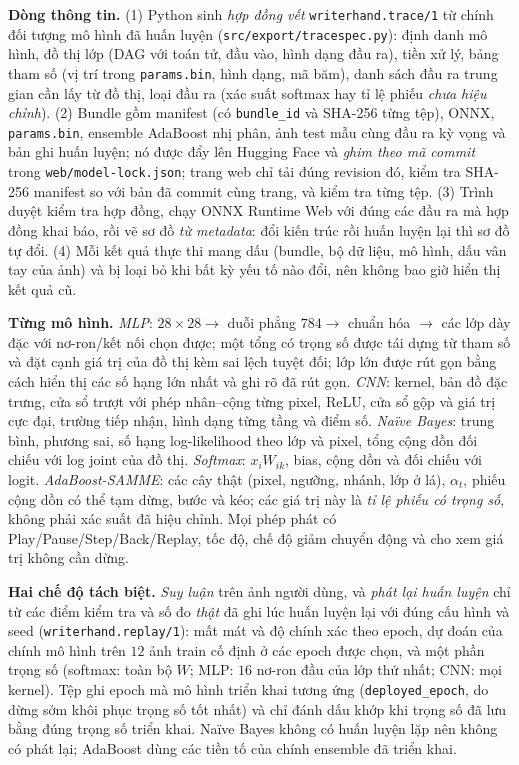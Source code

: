 \textbf{Dòng thông tin.} (1) Python sinh \emph{hợp đồng vết} \texttt{writerhand.trace/1} từ chính đối tượng mô hình đã huấn luyện (\texttt{src/export/tracespec.py}): định danh mô hình, đồ thị lớp (DAG với toán tử, đầu vào, hình dạng đầu ra), tiền xử lý, bảng tham số (vị trí trong \texttt{params.bin}, hình dạng, mã băm), danh sách đầu ra trung gian cần lấy từ đồ thị, loại đầu ra (xác suất softmax hay tỉ lệ phiếu \emph{chưa hiệu chỉnh}). (2) Bundle gồm manifest (có \texttt{bundle\_id} và SHA-256 từng tệp), ONNX, \texttt{params.bin}, ensemble AdaBoost nhị phân, ảnh test mẫu cùng đầu ra kỳ vọng và bản ghi huấn luyện; nó được đẩy lên Hugging Face và \emph{ghim theo mã commit} trong \texttt{web/model-lock.json}; trang web chỉ tải đúng revision đó, kiểm tra SHA-256 manifest so với bản đã commit cùng trang, và kiểm tra từng tệp. (3) Trình duyệt kiểm tra hợp đồng, chạy ONNX Runtime Web với đúng các đầu ra mà hợp đồng khai báo, rồi vẽ sơ đồ \emph{từ metadata}: đổi kiến trúc rồi huấn luyện lại thì sơ đồ tự đổi. (4) Mỗi kết quả thực thi mang dấu (bundle, bộ dữ liệu, mô hình, dấu vân tay của ảnh) và bị loại bỏ khi bất kỳ yếu tố nào đổi, nên không bao giờ hiển thị kết quả cũ.

\textbf{Từng mô hình.} \emph{MLP}: $28\times28\to$ duỗi phẳng $784\to$ chuẩn hóa $\to$ các lớp dày đặc với nơ-ron/kết nối chọn được; một tổng có trọng số được tái dựng từ tham số và đặt cạnh giá trị của đồ thị kèm sai lệch tuyệt đối; lớp lớn được rút gọn bằng cách hiển thị các số hạng lớn nhất và ghi rõ đã rút gọn. \emph{CNN}: kernel, bản đồ đặc trưng, cửa sổ trượt với phép nhân--cộng từng pixel, ReLU, cửa sổ gộp và giá trị cực đại, trường tiếp nhận, hình dạng từng tầng và điểm số. \emph{Naïve Bayes}: trung bình, phương sai, số hạng log-likelihood theo lớp và pixel, tổng cộng dồn đối chiếu với log joint của đồ thị. \emph{Softmax}: $x_iW_{ik}$, bias, cộng dồn và đối chiếu với logit. \emph{AdaBoost-SAMME}: các cây thật (pixel, ngưỡng, nhánh, lớp ở lá), $\alpha_t$, phiếu cộng dồn có thể tạm dừng, bước và kéo; các giá trị này là \emph{tỉ lệ phiếu có trọng số}, không phải xác suất đã hiệu chỉnh. Mọi phép phát có Play/Pause/Step/Back/Replay, tốc độ, chế độ giảm chuyển động và cho xem giá trị không cần dừng.

\textbf{Hai chế độ tách biệt.} \emph{Suy luận} trên ảnh người dùng, và \emph{phát lại huấn luyện} chỉ từ các điểm kiểm tra và số đo \emph{thật} đã ghi lúc huấn luyện lại với đúng cấu hình và seed (\texttt{writerhand.replay/1}): mất mát và độ chính xác theo epoch, dự đoán của chính mô hình trên $12$ ảnh train cố định ở các epoch được chọn, và một phần trọng số (softmax: toàn bộ $W$; MLP: $16$ nơ-ron đầu của lớp thứ nhất; CNN: mọi kernel). Tệp ghi epoch mà mô hình triển khai tương ứng (\texttt{deployed\_epoch}, do dừng sớm khôi phục trọng số tốt nhất) và chỉ đánh dấu khớp khi trọng số đã lưu bằng đúng trọng số triển khai. Naïve Bayes không có huấn luyện lặp nên không có phát lại; AdaBoost dùng các tiền tố của chính ensemble đã triển khai.

